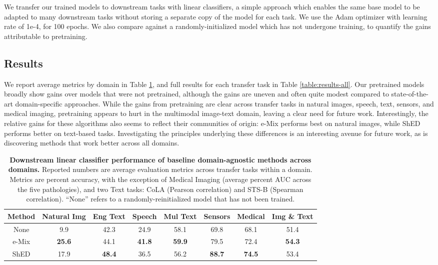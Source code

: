 \documentclass{article}
\begin{document}
We transfer our trained models to downstream tasks with linear classifiers, a simple approach which enables the same base model to be adapted to many downstream tasks without storing a separate copy of the model for each task. We use the Adam optimizer \citep{kingma2014adam} with learning rate of 1e-4,  for 100 epochs. We also compare against a randomly-initialized model which has not undergone training, to quantify the gains attributable to pretraining.

\subsection{Results}
We report average metrics by domain in Table \ref{table:results}, and full results for each transfer task in Table \ref{table:results-all}.  Our pretrained models broadly show gains over models that were not pretrained, although the gains are uneven and often quite modest compared to state-of-the-art domain-specific approaches. While the gains from pretraining are clear across transfer tasks in natural images, speech, text, sensors, and medical imaging, pretraining appears to hurt in the multimodal image-text domain, leaving a clear need for future work.  Interestingly, the relative gains for these algorithms also seems to reflect their communities of origin: e-Mix performs best on natural images, while ShED performs better on text-based tasks. Investigating the principles underlying these differences is an interesting avenue for future work, as is discovering methods that work better across all domains. 


\begin{table}
\centering
\begin{tabular}{cccccccc}
\toprule
Method & Natural Img & Eng Text & Speech & Mul Text  & Sensors & Medical & Img \& Text \\
\midrule
None   & 9.9 & 42.3 & 24.9 & 58.1 & 69.8 & 68.1 & 51.4  \\
e-Mix  & \textbf{25.6} & 44.1 & \textbf{41.8} &	\textbf{59.9} & 79.5 & 72.4 & \textbf{54.3}  \\
ShED   & 17.9 & \textbf{48.4} & 36.5 & 56.2 & \textbf{88.7} & \textbf{74.5} & 53.4  \\
\bottomrule
\end{tabular}
\vspace{.2cm}
\caption{\textbf{Downstream linear classifier performance of baseline domain-agnostic methods across domains.} Reported numbers are average evaluation metrics across transfer tasks within a domain. Metrics are percent accuracy, with the exception of Medical Imaging (average percent AUC across the five pathologies), and two Text tasks: CoLA (Pearson correlation) and STS-B (Spearman correlation). ``None'' refers to a randomly-reinitialized model that has not been trained.}
\label{table:results}
\end{table}
\end{document}
